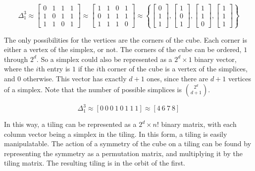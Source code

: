 \documentclass[12pt]{scrippsthesis}
\theoremstyle{definition}
\theoremstyle{remark}
\theoremstyle{plain}
\begin{document}
\begin{equation}
\Delta^3_1 \approx
	\left[\begin{array}{cccc}
		0 & 1 & 1 & 1\\
		1 & 0 & 1 & 1\\
		1 & 1 & 0 & 1
	\end{array}\right]
\approx
	\left[\begin{array}{cccc}
		1 & 1 & 0 & 1\\
		0 & 1 & 1 & 1\\
		1 & 1 & 1 & 0
	\end{array}\right]
\approx
\left\{
	\left[\begin{array}{c}
		0\\
		1 \\
		1 
	\end{array}\right]
,
\left[\begin{array}{c}
		1\\
		0 \\
		1 
	\end{array}\right]
,
\left[\begin{array}{c}
		1\\
		1 \\
		0 
	\end{array}\right]
,
\left[\begin{array}{c}
		1\\
		1 \\
		1 
	\end{array}\right]
\right\}
\end{equation}


The only possibilities for the vertices are the corners of the cube.  Each corner is either a vertex of the simplex, or not.  The corners of the cube can be ordered, $1$ through $2^d$.  So a simplex could also be represented as a $2^d \times 1$ binary vector, where the $i$th entry is $1$ if the $i$th corner of the cube is a vertex of the simplices, and $0$ otherwise.  This vector has exactly $d+1$ ones, since there are $d+1$ vertices of a simplex.  Note that the number of possible simplices is ${2^d \choose d+1}$.  

\begin{equation}
\Delta^3_1 \approx [0 \ 0 \ 0 \ 1\ 0 \ 1 \ 1 \ 1] \approx [4\ 6\ 7\ 8]
\end{equation}



In this way, a tiling can be represented as a $2^d \times n!$ binary matrix, with each column vector being a simplex in the tiling.  In this form, a tiling is easily manipulatable.  The action of a  symmetry of the cube on a tiling can be found by representing the symmetry as a permutation matrix, and multiplying it by the tiling matrix.  The resulting tiling is in the orbit of the first.
\end{document}
